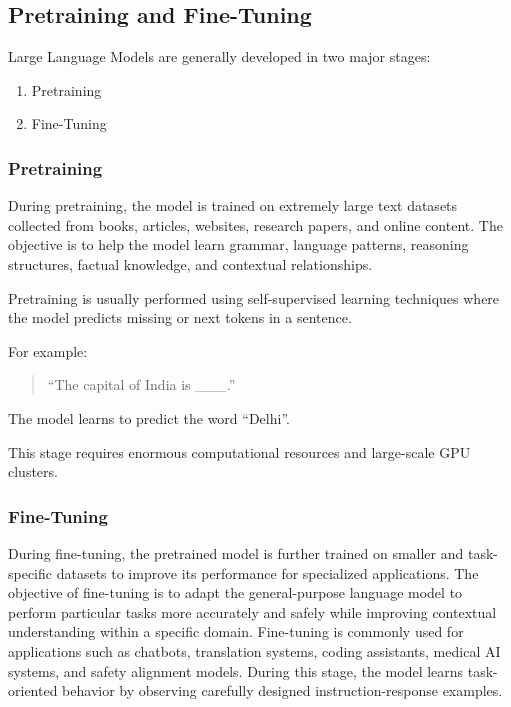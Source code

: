 \documentclass[12pt, a4paper, onecolumn]{report}
\begin{document}
\subsection{Pretraining and Fine-Tuning}

Large Language Models are generally developed in two major stages:

\begin{enumerate}
    \item Pretraining
    \item Fine-Tuning
\end{enumerate}

\subsubsection{Pretraining}

During pretraining, the model is trained on extremely large text datasets collected from books, articles, websites, research papers, and online content. The objective is to help the model learn grammar, language patterns, reasoning structures, factual knowledge, and contextual relationships.

Pretraining is usually performed using self-supervised learning techniques where the model predicts missing or next tokens in a sentence.

For example:

\begin{quote}
“The capital of India is \_\_\_.”
\end{quote}

The model learns to predict the word “Delhi”.

This stage requires enormous computational resources and large-scale GPU clusters.

\subsubsection{Fine-Tuning}

During fine-tuning, the pretrained model is further trained on smaller and task-specific datasets to improve its performance for specialized applications. The objective of fine-tuning is to adapt the general-purpose language model to perform particular tasks more accurately and safely while improving contextual understanding within a specific domain. Fine-tuning is commonly used for applications such as chatbots, translation systems, coding assistants, medical AI systems, and safety alignment models. During this stage, the model learns task-oriented behavior by observing carefully designed instruction-response examples.
\end{document}
